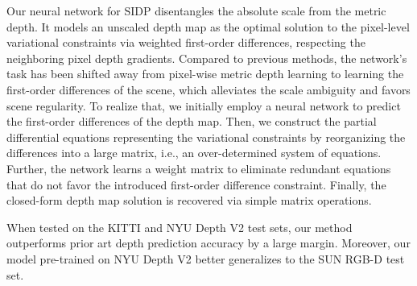 \documentclass{article} \usepackage{iclr2023_conference, times}
\begin{document}
Our neural network for SIDP disentangles the absolute scale from the metric depth. It models an unscaled depth map as the optimal solution to the pixel-level variational constraints via weighted first-order differences, respecting the neighboring pixel depth gradients. Compared to previous methods, the network's task has been shifted away from pixel-wise metric depth learning to learning the first-order differences of the scene, which alleviates the scale ambiguity and favors scene regularity. To realize that, we initially employ a neural network to predict the first-order differences of the depth map. Then, we construct the partial differential equations representing the variational constraints by reorganizing the differences into a large matrix, i.e., an over-determined system of equations. Further, the network learns a weight matrix to eliminate redundant equations that do not favor the introduced first-order difference constraint. Finally, the closed-form depth map solution is recovered via simple matrix operations.  

When tested on the KITTI  \citep{geiger2012we} and NYU Depth V2 \citep{silberman2012indoor} test sets, our method outperforms prior art depth prediction accuracy by a large margin. Moreover, our model pre-trained on NYU Depth V2 better generalizes to the SUN RGB-D test set. 
\end{document}
